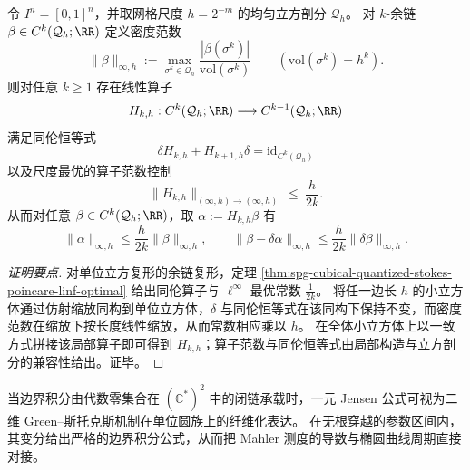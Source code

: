 \begin{theorem}\label{thm:conclusion-uniform-grid-quantized-stokes-poincare-scale}
令 \(I^n=[0,1]^n\)，并取网格尺度 \(h=2^{-m}\) 的均匀立方剖分 \(\mathcal Q_h\)。
对 \(k\)-余链 \(\beta\in C^k(\mathcal Q_h;\RR)\) 定义密度范数
\[
\|\beta\|_{\infty,h}:=\max_{\sigma^k\in\mathcal Q_h}\frac{|\beta(\sigma^k)|}{\mathrm{vol}(\sigma^k)}
\qquad(\mathrm{vol}(\sigma^k)=h^k).
\]
则对任意 \(k\ge 1\) 存在线性算子
\[
H_{k,h}:C^k(\mathcal Q_h;\RR)\longrightarrow C^{k-1}(\mathcal Q_h;\RR)
\]
满足同伦恒等式
\[
\delta H_{k,h}+H_{k+1,h}\delta=\mathrm{id}_{C^k(\mathcal Q_h)}
\]
以及尺度最优的算子范数控制
\[
\|H_{k,h}\|_{(\infty,h)\to(\infty,h)}\ \le\ \frac{h}{2k}.
\]
从而对任意 \(\beta\in C^k(\mathcal Q_h;\RR)\)，取 \(\alpha:=H_{k,h}\beta\) 有
\[
\|\alpha\|_{\infty,h}\le \frac{h}{2k}\|\beta\|_{\infty,h},
\qquad
\|\beta-\delta\alpha\|_{\infty,h}\le \frac{h}{2k}\|\delta\beta\|_{\infty,h}.
\]
\end{theorem}
\begin{proof}[证明要点]
对单位立方复形的余链复形，定理 \ref{thm:spg-cubical-quantized-stokes-poincare-linf-optimal} 给出同伦算子与 \(\ell^\infty\) 最优常数 \(\frac{1}{2k}\)。
将任一边长 \(h\) 的小立方体通过仿射缩放同构到单位立方体，\(\delta\) 与同伦恒等式在该同构下保持不变，而密度范数在缩放下按长度线性缩放，从而常数相应乘以 \(h\)。
在全体小立方体上以一致方式拼接该局部算子即可得到 \(H_{k,h}\)；算子范数与同伦恒等式由局部构造与立方剖分的兼容性给出。证毕。
\end{proof}

当边界积分由代数零集合在 \((\mathbb C^\ast)^2\) 中的闭链承载时，一元 Jensen 公式可视为二维 Green--斯托克斯机制在单位圆族上的纤维化表达。
在无根穿越的参数区间内，其变分给出严格的边界积分公式，从而把 Mahler 测度的导数与椭圆曲线周期直接对接。

